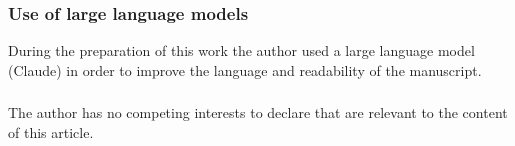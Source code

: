 \documentclass{llncs}
\begin{document}
\begin{credits}

\subsubsection{Use of large language models}
During the preparation of this work the author used a large language model
(Claude) in order to improve the language and readability of the manuscript.

\subsubsection{\discintname}
The author has no competing interests to declare that are relevant to
the content of this article.
\end{credits}

\printbibliography
\end{document}
